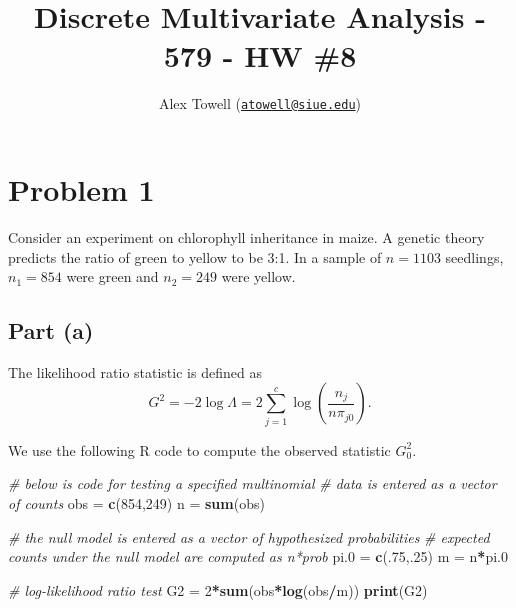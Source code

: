 \documentclass[
]{article}
\title{Discrete Multivariate Analysis - 579 - HW \#8}
\author{Alex Towell
(\href{mailto:atowell@siue.edu}{\nolinkurl{atowell@siue.edu}})}
\date{}
\newenvironment{Shaded}{\begin{snugshade}}{\end{snugshade}}
\newcommand{\CommentTok}[1]{\textcolor[rgb]{0.56,0.35,0.01}{\textit{#1}}}
\newcommand{\DecValTok}[1]{\textcolor[rgb]{0.00,0.00,0.81}{#1}}
\newcommand{\FloatTok}[1]{\textcolor[rgb]{0.00,0.00,0.81}{#1}}
\newcommand{\FunctionTok}[1]{\textcolor[rgb]{0.13,0.29,0.53}{\textbf{#1}}}
\newcommand{\NormalTok}[1]{#1}
\newcommand{\OtherTok}[1]{\textcolor[rgb]{0.56,0.35,0.01}{#1}}
\newcommand{\SpecialCharTok}[1]{\textcolor[rgb]{0.81,0.36,0.00}{\textbf{#1}}}
\begin{document}
\maketitle

\newcommand{\var}{\operatorname{Var}}
\newcommand{\expect}{\operatorname{E}}
\newcommand{\corr}{\operatorname{Corr}}
\newcommand{\cov}{\operatorname{Cov}}
\newcommand{\ssr}{\operatorname{SSR}}
\newcommand{\se}{\operatorname{SE}}
\newcommand{\mat}[1]{\mathbf{#1}}
\newcommand{\RR}{\operatorname{RR}}
\newcommand{\eval}[2]{\left. #1 \right\vert_{#2}}

\hypertarget{problem-1}{%
\section{Problem 1}\label{problem-1}}

Consider an experiment on chlorophyll inheritance in maize. A genetic
theory predicts the ratio of green to yellow to be 3:1. In a sample of
\(n = 1103\) seedlings, \(n_1 = 854\) were green and \(n_2 = 249\) were
yellow.

\hypertarget{part-a}{%
\subsection{Part (a)}\label{part-a}}


The likelihood ratio statistic is defined as \[
  G^2 = - 2 \log \Lambda = 2 \sum_{j=1}^{c} \log\left(\frac{n_j}{n \pi_{j 0}}\right).
\]

We use the following R code to compute the observed statistic \(G_0^2\).

\begin{Shaded}
\begin{Highlighting}[]
\CommentTok{\# below is code for testing a specified multinomial}
\CommentTok{\# data is entered as a vector of counts}
\NormalTok{obs }\OtherTok{=} \FunctionTok{c}\NormalTok{(}\DecValTok{854}\NormalTok{,}\DecValTok{249}\NormalTok{)}
\NormalTok{n }\OtherTok{=} \FunctionTok{sum}\NormalTok{(obs)}

\CommentTok{\# the null model is entered as a vector of hypothesized probabilities}
\CommentTok{\# expected counts under the null model are computed as n*prob}
\NormalTok{pi}\FloatTok{.0} \OtherTok{=} \FunctionTok{c}\NormalTok{(.}\DecValTok{75}\NormalTok{,.}\DecValTok{25}\NormalTok{)}
\NormalTok{m }\OtherTok{=}\NormalTok{ n}\SpecialCharTok{*}\NormalTok{pi}\FloatTok{.0}

\CommentTok{\# log{-}likelihood ratio test}
\NormalTok{G2 }\OtherTok{=} \DecValTok{2}\SpecialCharTok{*}\FunctionTok{sum}\NormalTok{(obs}\SpecialCharTok{*}\FunctionTok{log}\NormalTok{(obs}\SpecialCharTok{/}\NormalTok{m))}
\FunctionTok{print}\NormalTok{(G2)}
\end{Highlighting}
\end{Shaded}
\end{document}
